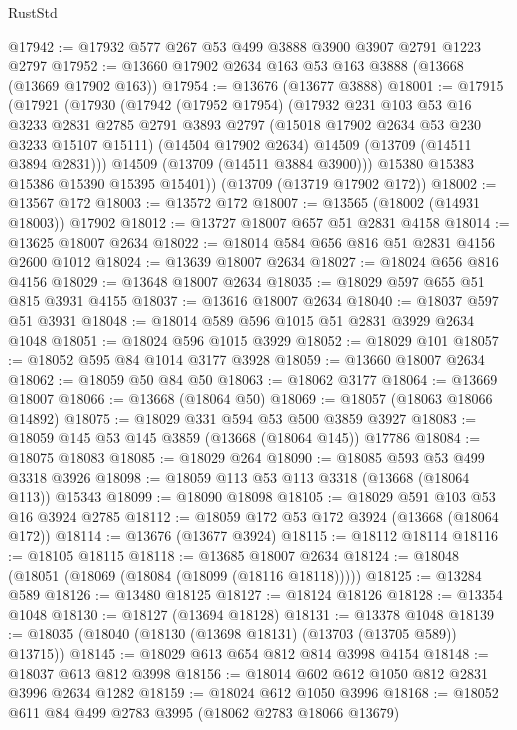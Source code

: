 \begin{lexlean}{RustStd}
\begin{coremodule}
@17942 := @17932 @577 @267 @53 @499 @3888 @3900 @3907 @2791 @1223 @2797
@17952 := @13660 @17902 @2634 @163 @53 @163 @3888 (@13668 (@13669 @17902 @163))
@17954 := @13676 (@13677 @3888)
@18001 := @17915
    (@17921
      (@17930
        (@17942
          (@17952 @17954)
          (@17932
            @231
            @103
            @53
            @16
            @3233
            @2831
            @2785
            @2791
            @3893
            @2797
            (@15018 @17902 @2634 @53 @230 @3233 @15107 @15111)
            (@14504 @17902 @2634)
            @14509
            (@13709 (@14511 @3894 @2831)))
          @14509
          (@13709 (@14511 @3884 @3900)))
        @15380
        @15383
        @15386
        @15390
        @15395
        @15401))
    (@13709 (@13719 @17902 @172))
@18002 := @13567 @172
@18003 := @13572 @172
@18007 := @13565 (@18002 (@14931 @18003)) @17902
@18012 := @13727 @18007 @657 @51 @2831 @4158
@18014 := @13625 @18007 @2634
@18022 := @18014 @584 @656 @816 @51 @2831 @4156 @2600 @1012
@18024 := @13639 @18007 @2634
@18027 := @18024 @656 @816 @4156
@18029 := @13648 @18007 @2634
@18035 := @18029 @597 @655 @51 @815 @3931 @4155
@18037 := @13616 @18007 @2634
@18040 := @18037 @597 @51 @3931
@18048 := @18014 @589 @596 @1015 @51 @2831 @3929 @2634 @1048
@18051 := @18024 @596 @1015 @3929
@18052 := @18029 @101
@18057 := @18052 @595 @84 @1014 @3177 @3928
@18059 := @13660 @18007 @2634
@18062 := @18059 @50 @84 @50
@18063 := @18062 @3177
@18064 := @13669 @18007
@18066 := @13668 (@18064 @50)
@18069 := @18057 (@18063 @18066 @14892)
@18075 := @18029 @331 @594 @53 @500 @3859 @3927
@18083 := @18059 @145 @53 @145 @3859 (@13668 (@18064 @145)) @17786
@18084 := @18075 @18083
@18085 := @18029 @264
@18090 := @18085 @593 @53 @499 @3318 @3926
@18098 := @18059 @113 @53 @113 @3318 (@13668 (@18064 @113)) @15343
@18099 := @18090 @18098
@18105 := @18029 @591 @103 @53 @16 @3924 @2785
@18112 := @18059 @172 @53 @172 @3924 (@13668 (@18064 @172))
@18114 := @13676 (@13677 @3924)
@18115 := @18112 @18114
@18116 := @18105 @18115
@18118 := @13685 @18007 @2634
@18124 := @18048 (@18051 (@18069 (@18084 (@18099 (@18116 @18118)))))
@18125 := @13284 @589
@18126 := @13480 @18125
@18127 := @18124 @18126
@18128 := @13354 @1048
@18130 := @18127 (@13694 @18128)
@18131 := @13378 @1048
@18139 := @18035 (@18040 (@18130 (@13698 @18131) (@13703 (@13705 @589)) @13715))
@18145 := @18029 @613 @654 @812 @814 @3998 @4154
@18148 := @18037 @613 @812 @3998
@18156 := @18014 @602 @612 @1050 @812 @2831 @3996 @2634 @1282
@18159 := @18024 @612 @1050 @3996
@18168 := @18052 @611 @84 @499 @2783 @3995 (@18062 @2783 @18066 @13679)

\end{coremodule}
\end{lexlean}
